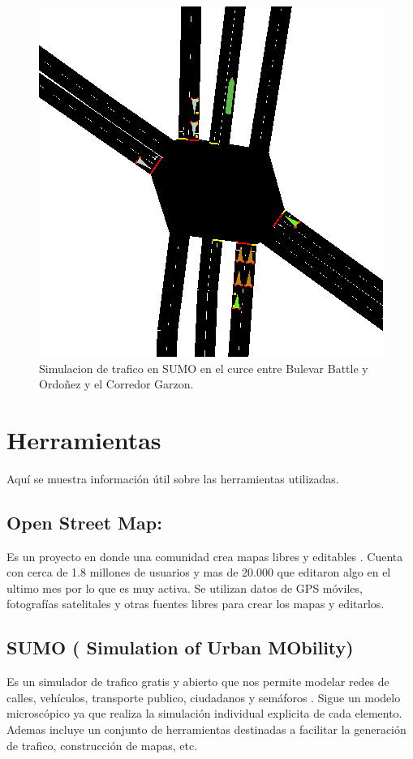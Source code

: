 \begin{figure}[H]
	\centering
	\includegraphics[width=0.7\linewidth]{Figures/sim1}
	\caption{Simulacion de trafico en SUMO en el curce entre Bulevar Battle y Ordoñez y el Corredor Garzon.}
	\label{fig:sim1}
\end{figure}




\section{Herramientas}
Aquí se muestra información útil sobre las herramientas utilizadas.

\subsection{Open Street Map:} 
 Es un proyecto en donde una comunidad crea mapas libres y editables \citep{OSM}. Cuenta con cerca de 1.8 millones de usuarios  y  mas de 20.000 que editaron algo en el ultimo mes \citep{OSMSTATS} por lo que es muy activa. Se utilizan datos de GPS móviles, fotografías satelitales y otras fuentes libres para crear los mapas y editarlos. 

\subsection{SUMO ( Simulation of Urban MObility)}

Es un simulador de trafico gratis y abierto que nos permite modelar redes de calles, vehículos, transporte publico, ciudadanos y semáforos \citep{SUMO}. Sigue un modelo microscópico ya que realiza la simulación individual explicita de cada elemento. Ademas incluye un conjunto de herramientas destinadas  a facilitar la generación de trafico, construcción de mapas, etc. 


